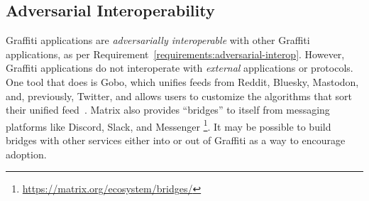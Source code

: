 





\subsection{Adversarial Interoperability}

Graffiti applications are \emph{adversarially interoperable} with other Graffiti
applications, as per Requirement~\ref{requirements:adversarial-interop}.
However, Graffiti applications do not interoperate with \emph{external}
applications or protocols.
One tool that does is Gobo, which unifies feeds from Reddit, Bluesky,
Mastodon, and, previously, Twitter,
and allows users to customize the algorithms that sort their unified feed~\cite{gobo}.
Matrix also provides ``bridges'' to itself from messaging platforms like
Discord, Slack, and Messenger
\footnote{
    \url{https://matrix.org/ecosystem/bridges/}
}.
It may be possible to build bridges with other services either into or out of
Graffiti as a way to encourage adoption.


